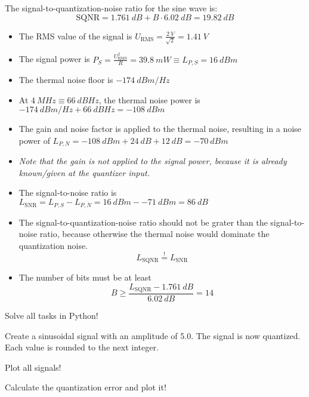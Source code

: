 \begin{solution}
\begin{tasks}
		The signal-to-quantization-noise ratio for the sine wave is:
		\begin{equation*}
			\mathrm{SQNR} = \SI{1.761}{dB} + B \cdot \SI{6.02}{dB} = \SI{19.82}{dB}
		\end{equation*}
		
		\task
		\begin{itemize}
			\item The RMS value of the signal is $U_{\mathrm{RMS}} = \frac{\SI{2}{V}}{\sqrt{2}} = \SI{1.41}{V}$
			\item The signal power is $P_S = \frac{U_{\mathrm{RMS}}^2}{R} = \SI{39.8}{mW} \equiv L_{P,S} = \SI{16}{dBm}$
			\item The thermal noise floor is $\SI{-174}{dBm/Hz}$
			\item At $\SI{4}{MHz} \equiv \SI{66}{dBHz}$, the thermal noise power is $\SI{-174}{dBm/Hz} + \SI{66}{dBHz} = \SI{-108}{dBm}$
			\item The gain and noise factor is applied to the thermal noise, resulting in a noise power of $L_{P,N} = \SI{-108}{dBm} + \SI{24}{dB} + \SI{12}{dB} = \SI{-70}{dBm}$
			\item \textit{Note that the gain is not applied to the signal power, because it is already known/given at the quantizer input.}
			\item The signal-to-noise ratio is $L_{\mathrm{SNR}} = L_{P,S} - L_{P,N} = \SI{16}{dBm} - \SI{-71}{dBm} = \SI{86}{dB}$
			\item The signal-to-quantization-noise ratio should not be grater than the signal-to-noise ratio, because otherwise the thermal noise would dominate the quantization noise.
			\begin{equation*}
				L_{\mathrm{SQNR}} \stackrel{!}{=} L_{\mathrm{SNR}}
			\end{equation*}
			\item The number of bits must be at least
			\begin{equation*}
				B \geq \frac{L_{\mathrm{SQNR}} - \SI{1.761}{dB}}{\SI{6.02}{dB}} = 14
			\end{equation*}
		\end{itemize}
	\end{tasks}
\end{solution}

\begin{question}[subtitle={Python Programming: Quantization}]
Solve all tasks in Python!

Create a sinusoidal signal with an amplitude of 5.0. The signal is now quantized. Each value is rounded to the next integer.

Plot all signals!

Calculate the quantization error and plot it!
\end{question}

